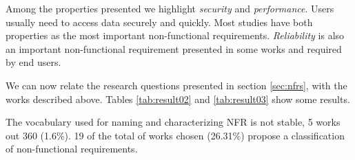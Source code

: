 \documentclass{sig-alternate}
\begin{document}

Among the properties presented we highlight \textit{security}
and \textit{performance}. Users usually need to access data
securely and quickly. Most studies have both properties as the most
important non-functional requirements. \textit{Reliability} is also an important
non-functional requirement presented in some works and required by end users.

We can now relate the research questions presented in section \ref{sec:nfrs},
with the works described above. Tables \ref{tab:result02} and \ref{tab:result03}
show some results.

The vocabulary used for naming and characterizing NFR is not stable, 5 works out
360 (1.6\%). 19 of the total of works chosen (26.31\%) propose a
classification of non-functional requirements.


\end{document}
